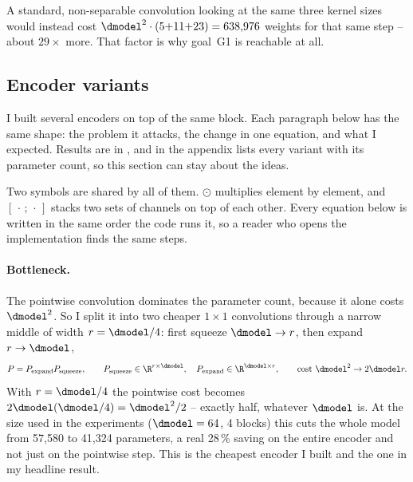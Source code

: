 A standard, non-separable convolution looking at the same three kernel sizes would instead cost
$\dmodel^2 \cdot (5{+}11{+}23) = 638{,}976$ weights for that same step -- about $29\times$ more.
That factor is why goal~G1 is reachable at all.

\subsection{Encoder variants}
\label{sec:arch:variants}

I built several encoders on top of the same block. Each paragraph below has the same shape: the
problem it attacks, the change in one equation, and what I expected. Results are in
, and  in the appendix lists every variant with its
parameter count, so this section can stay about the ideas.

Two symbols are shared by all of them. $\odot$ multiplies element by element, and $[\,\cdot\,;\,
\cdot\,]$ stacks two sets of channels on top of each other. Every equation below is written in the
same order the code runs it, so a reader who opens the implementation finds the same steps.

\paragraph{Bottleneck.}
The pointwise convolution dominates the parameter count, because it alone costs $\dmodel^2$. So I
split it into two cheaper $1\times1$ convolutions through a narrow middle of width
$r = \dmodel / 4$: first squeeze $\dmodel \to r$, then expand $r \to \dmodel$,
\begin{equation}
  P = P_{\text{expand}} P_{\text{squeeze}}, \qquad
  P_{\text{squeeze}} \in \R^{r \times \dmodel}, \quad
  P_{\text{expand}} \in \R^{\dmodel \times r},
  \qquad \text{cost } \dmodel^2 \rightarrow 2\dmodel r .
  \label{eq:bottleneck}
\end{equation}
With $r = \dmodel/4$ the pointwise cost becomes $2\dmodel(\dmodel/4) = \dmodel^2/2$ -- exactly half,
whatever $\dmodel$ is. At the size used in the experiments ($\dmodel = 64$, 4 blocks) this cuts the
whole model from 57{,}580 to 41{,}324 parameters, a real 28\,\% saving on the entire encoder and not
just on the pointwise step. This is the cheapest encoder I built and the one in my headline result.

